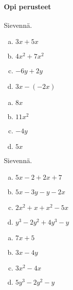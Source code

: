 \begin{tehtavasivu}

\paragraph*{Opi perusteet}

\begin{tehtava}
    Sievennä.
    \begin{enumerate}[a)]
        \item $3x+5x $
        \item $4x^2+7x^2$
        \item $-6y+2y $
        \item $3x-(-2x)$
    \end{enumerate}
    \begin{vastaus}
        \begin{enumerate}[a)]
            \item $8x$
            \item $11x^2$
            \item $-4y$
            \item $5x$
        \end{enumerate}
    \end{vastaus}
\end{tehtava}

\begin{tehtava}
    Sievennä.
    \begin{enumerate}[a)]
    	\item $5x-2+2x+7$
        \item $5x-3y-y-2x$
        \item $2x^2+x+x^2-5x$
        \item $y^3 - 2y^2+4y^3-y $
    \end{enumerate}
    \begin{vastaus}
        \begin{enumerate}[a)]
        	\item $7x+5$
            \item $3x-4y$
            \item $3x^2-4x$
            \item $5y^3-2y^2-y$
        \end{enumerate}
    \end{vastaus}
\end{tehtava}


\end{tehtavasivu}
